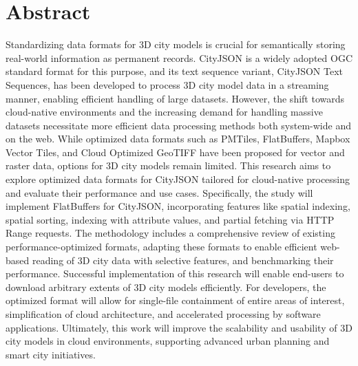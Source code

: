 
\chapter*{Abstract}
Standardizing data formats for 3D city models is crucial for semantically storing real-world information as permanent records.
CityJSON is a widely adopted OGC standard format for this purpose, and its text sequence variant, CityJSON Text Sequences, has been developed to process 3D city model data in a streaming manner, enabling efficient handling of large datasets.
However, the shift towards cloud-native environments and the increasing demand for handling massive datasets necessitate more efficient data processing methods both system-wide and on the web.
While optimized data formats such as PMTiles, FlatBuffers, Mapbox Vector Tiles, and Cloud Optimized GeoTIFF have been proposed for vector and raster data, options for 3D city models remain limited.
This research aims to explore optimized data formats for CityJSON tailored for cloud-native processing and evaluate their performance and use cases.
Specifically, the study will implement FlatBuffers for CityJSON, incorporating features like spatial indexing, spatial sorting, indexing with attribute values, and partial fetching via HTTP Range requests.
The methodology includes a comprehensive review of existing performance-optimized formats, adapting these formats to enable efficient web-based reading of 3D city data with selective features, and benchmarking their performance.
Successful implementation of this research will enable end-users to download arbitrary extents of 3D city models efficiently.
For developers, the optimized format will allow for single-file containment of entire areas of interest, simplification of cloud architecture, and accelerated processing by software applications.
Ultimately, this work will improve the scalability and usability of 3D city models in cloud environments, supporting advanced urban planning and smart city initiatives.